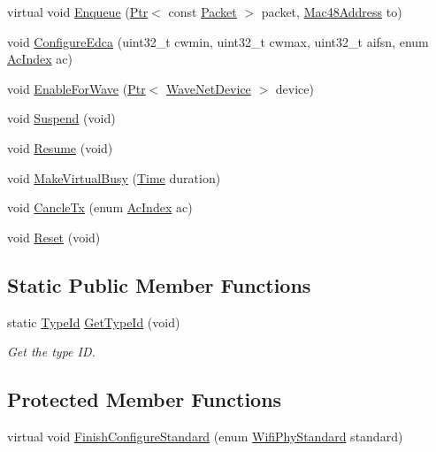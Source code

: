 \begin{DoxyCompactItemize}
\item 
virtual void \hyperlink{classns3_1_1OcbWifiMac_a0e2d6d1c5841a46d5649a9b31cf9d51c}{Enqueue} (\hyperlink{classns3_1_1Ptr}{Ptr}$<$ const \hyperlink{classns3_1_1Packet}{Packet} $>$ packet, \hyperlink{classns3_1_1Mac48Address}{Mac48\+Address} to)
\item 
void \hyperlink{classns3_1_1OcbWifiMac_ac22b6919845bacc7bef4cf6426e95bbd}{Configure\+Edca} (uint32\+\_\+t cwmin, uint32\+\_\+t cwmax, uint32\+\_\+t aifsn, enum \hyperlink{group__wifi_gab422b4562ba272b39a9b6bca3513f3ac}{Ac\+Index} ac)
\item 
void \hyperlink{classns3_1_1OcbWifiMac_a7da6015f1bb04ffbb0974f9c94ccf988}{Enable\+For\+Wave} (\hyperlink{classns3_1_1Ptr}{Ptr}$<$ \hyperlink{classns3_1_1WaveNetDevice}{Wave\+Net\+Device} $>$ device)
\item 
void \hyperlink{classns3_1_1OcbWifiMac_aa225044c84d3a80b2f7e2d721d13b481}{Suspend} (void)
\item 
void \hyperlink{classns3_1_1OcbWifiMac_aee8907d49aac54ae17ca13cde9f8e844}{Resume} (void)
\item 
void \hyperlink{classns3_1_1OcbWifiMac_ab7719e7ccdc4cbfd99a802e7694ed6d1}{Make\+Virtual\+Busy} (\hyperlink{classns3_1_1Time}{Time} duration)
\item 
void \hyperlink{classns3_1_1OcbWifiMac_a3a58e02b96aef98dbbb7a9b9d9861e7b}{Cancle\+Tx} (enum \hyperlink{group__wifi_gab422b4562ba272b39a9b6bca3513f3ac}{Ac\+Index} ac)
\item 
void \hyperlink{classns3_1_1OcbWifiMac_af735dfafc5820e797233b8ce21bcf21b}{Reset} (void)
\end{DoxyCompactItemize}
\subsection*{Static Public Member Functions}
\begin{DoxyCompactItemize}
\item 
static \hyperlink{classns3_1_1TypeId}{Type\+Id} \hyperlink{classns3_1_1OcbWifiMac_a283e0a4e63e11f2ddf2e65ddb8859704}{Get\+Type\+Id} (void)
\begin{DoxyCompactList}\small\item\em Get the type ID. \end{DoxyCompactList}\end{DoxyCompactItemize}
\subsection*{Protected Member Functions}
\begin{DoxyCompactItemize}
\item 
virtual void \hyperlink{classns3_1_1OcbWifiMac_a492daf4c214ab772ad673810835f1d04}{Finish\+Configure\+Standard} (enum \hyperlink{group__wifi_ga1299834f4e1c615af3ca738033b76a49}{Wifi\+Phy\+Standard} standard)
\end{DoxyCompactItemize}
